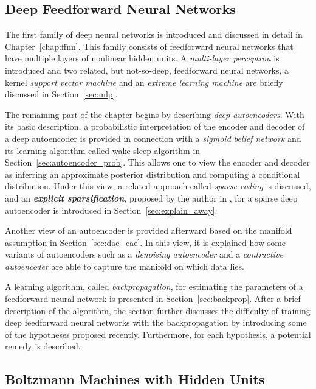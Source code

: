 \documentclass[dissertation,nocontribution,draft*]{aaltoseries}
\begin{document}
\subsection{Deep Feedforward Neural Networks}

The first family of deep neural networks is introduced and
discussed in detail in Chapter~\ref{chap:ffnn}. This family
consists of feedforward neural networks that have multiple
layers of nonlinear hidden units.  A \textit{multi-layer
perceptron} is introduced and two related, but not-so-deep,
feedforward neural networks, a kernel \textit{support
vector machine} and an \textit{extreme learning machine} are
briefly discussed in Section~\ref{sec:mlp}.

The remaining part of the chapter begins by describing
\textit{deep autoencoders}. With its basic description, a
probabilistic interpretation of the encoder and decoder of a
deep autoencoder is provided in connection with a
\textit{sigmoid belief network} and its learning algorithm
called wake-sleep algorithm in
Section~\ref{sec:autoencoder_prob}. This allows one to view
the encoder and decoder as inferring an approximate
posterior distribution and computing a conditional
distribution. Under this view, a related approach called
\textit{sparse coding} is discussed, and an
\textbf{\textit{explicit sparsification}}, proposed by the
author in , for a sparse deep
autoencoder is introduced in Section~\ref{sec:explain_away}.

Another view of an autoencoder is provided afterward based
on the manifold assumption in Section~\ref{sec:dae_cae}. In
this view, it is explained how some variants of autoencoders
such as a \textit{denoising autoencoder} and a
\textit{contractive autoencoder} are able to capture the
manifold on which data lies. 

A 
learning algorithm, called \textit{backpropagation}, for
estimating the parameters of a feedforward neural network is
presented in Section~\ref{sec:backprop}. After a brief
description of the algorithm, the section further discusses
the difficulty of training deep feedforward neural networks
with the backpropagation by introducing some of the
hypotheses proposed recently. Furthermore, for each
hypothesis, a potential remedy is described.

\subsection{Boltzmann Machines with Hidden Units}
\end{document}
